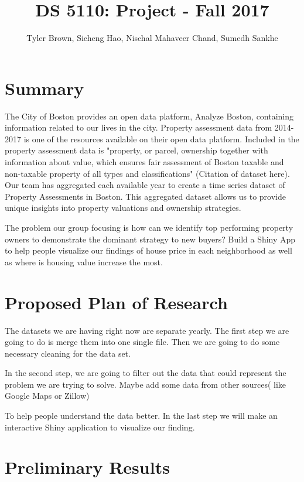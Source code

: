 \documentclass[12pt]{article}
\title{DS 5110: Project - Fall 2017}
\author{Tyler Brown, Sicheng Hao, Nischal Mahaveer Chand, Sumedh Sankhe}
\date{ }
\begin{document}
\maketitle

\section{Summary}

The City of Boston provides an open data platform, Analyze Boston, 
containing information related to our lives in the city. Property 
assessment data from 2014-2017 is one of the resources available on their
 open data platform. Included in the property assessment data is 
"property, or parcel, ownership together with information about value, 
which ensures fair assessment of Boston taxable and non-taxable property 
of all types and classifications" (Citation of dataset here). Our team 
has aggregated each available year to create a time series dataset of 
Property Assessments in Boston. This aggregated dataset allows us to 
provide unique insights into property valuations and ownership strategies.

The problem our group focusing is how can we identify top performing 
property owners to demonstrate the dominant strategy to new buyers? Build
 a Shiny App to help people visualize our findings of house price in each
 neighborhood as well as where is housing value increase the most. 

\section{Proposed Plan of Research}

 The datasets we are having right now are separate yearly. The first step 
we are going to do is merge them into one single file. Then we are going 
to do some necessary cleaning for the data set. 

In the second step, we are going to filter out the data that could 
represent the problem we are trying to solve. Maybe add some data from 
other sources( like Google Maps or Zillow)

To help people understand the data better. In the last step we will make 
an interactive Shiny application to visualize our finding. 


\section{Preliminary Results}
\end{document}
